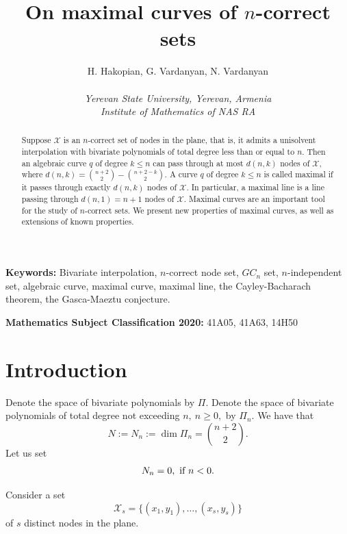 \documentclass[a4paper,12pt]{article}
\theoremstyle{definition}
\numberwithin{equation}{section}
\numberwithin{figure}{section}
\newcommand{\Xset}{\mathcal{X}}
\begin{document}
\newcommand{\RR}{\mathbb{R}^2}
\newcommand{\RN}{\mathbb{R}^n}




\title{On maximal curves of $n$-correct sets}

\author{H. Hakopian, G. Vardanyan, N. Vardanyan\\ \\
 \textit{Yerevan State University, Yerevan, Armenia}\\   \textit{Institute of Mathematics of NAS RA}}
\date{}
\maketitle


\begin{abstract} 
Suppose $\Xset$ is an $n$-correct set of nodes in the plane, that is, it admits a unisolvent interpolation with bivariate polynomials of total degree less than or equal to $n.$
Then an algebraic curve $q$ of degree $k\le n$ can pass through at most $d(n,k)$ nodes of $\Xset,$ where $d(n,k)={{n+2}\choose {2}}-{{n+2-k}\choose {2}}.$ A  curve $q$ of degree $k\le n$ is called maximal if it passes through exactly $d(n,k)$ nodes of $\Xset.$ In particular, a maximal line is a line passing through $d(n,1)=n+1$ nodes of $\Xset.$ Maximal curves are an important tool for the study of $n$-correct sets. We present new properties of maximal curves, as well as extensions of known properties.
\end{abstract}

{\bf Keywords:} Bivariate interpolation, $n$-correct node set, $GC_n$ set, $n$-independent set, algebraic curve, maximal curve, maximal line, the Cayley-Bacharach theorem, the Gasca-Maeztu conjecture.

{\bf Mathematics Subject Classification 2020:} 41A05, 41A63, 14H50

\section{Introduction}

Denote the space of bivariate polynomials by $\Pi.$ Denote the space of bivariate polynomials of total degree not exceeding $n,\ n\ge 0,$ by $\Pi_n$. We have that
$$N:=N_n:=\dim\Pi_n={{n+2}\choose {2}}.$$
Let us set \begin{equation}\label{n<0}N_n=0,\ \hbox{if}\ n<0.
\end{equation}


\noindent Consider a set
$$\Xset_s=\{ (x_1, y_1), \dots , (x_s, y_s) \}$$  of $s$ distinct nodes in the plane.
\end{document}
